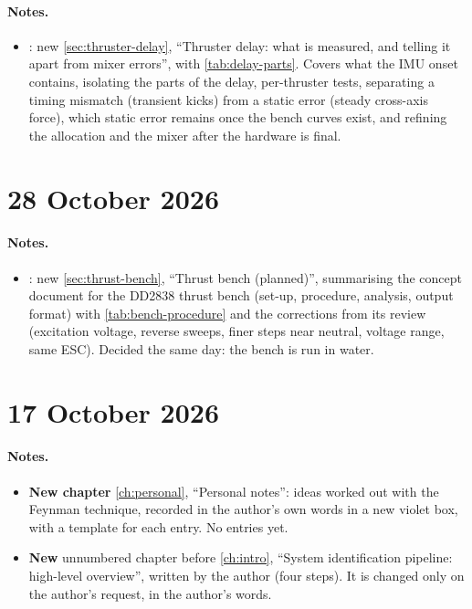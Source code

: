 \paragraph{Notes.}
\begin{itemize}
  \item {}: new \cref{sec:thruster-delay}, ``Thruster delay: what is measured, and
        telling it apart from mixer errors'', with \cref{tab:delay-parts}. Covers what the IMU
        onset contains, isolating the parts of the delay, per-thruster tests, separating a timing
        mismatch (transient kicks) from a static error (steady cross-axis force), which static
        error remains once the bench curves exist, and refining the allocation and the mixer
        after the hardware is final.
\end{itemize}

\section*{28 October 2026}

\paragraph{Notes.}
\begin{itemize}
  \item {}: new \cref{sec:thrust-bench}, ``Thrust bench (planned)'', summarising
        the concept document for the DD2838 thrust bench (set-up, procedure, analysis, output
        format) with \cref{tab:bench-procedure} and the corrections from its review (excitation
        voltage, reverse sweeps, finer steps near neutral, voltage range, same ESC). Decided the
        same day: the bench is run in water.
\end{itemize}

\section*{17 October 2026}

\paragraph{Notes.}
\begin{itemize}
  \item \textbf{New chapter} \cref{ch:personal}, ``Personal notes'': ideas worked out with the
        Feynman technique, recorded in the author's own words in a new violet 
        box, with a template for each entry. No entries yet.
  \item \textbf{New} unnumbered chapter before \cref{ch:intro}, ``System identification pipeline:
        high-level overview'', written by the author (four steps). It is changed only on the
        author's request, in the author's words.
\end{itemize}

